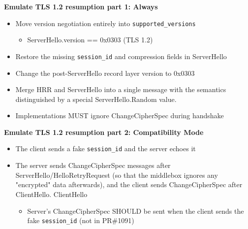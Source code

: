 \documentclass[helvetica]{seminar}
\newcommand{\heading}[1]{%
  \begin{center} 
    \large\bf 
    #1 
  \end{center} 
  \vspace{.4 in}}
\begin{document}
\begin{slide}
  \heading{Emulate TLS 1.2 resumption part 1: Always}

  \begin{itemize}
  \item Move version negotiation entirely into \verb^supported_versions^
    \begin{itemize}
    \item ServerHello.version == 0x0303 (TLS 1.2)
    \end{itemize}
  \item Restore the missing \verb^session_id^ and compression fields in ServerHello
  \item Change the post-ServerHello record layer version to 0x0303
  \item Merge HRR and ServerHello into a single message with the semantics
    distinguished by a special ServerHello.Random value.
    \item Implementations MUST ignore ChangeCipherSpec during handshake
  \end{itemize}
\end{slide}

\begin{slide}
  \heading{Emulate TLS 1.2 resumption part 2: Compatibility Mode}

  \begin{itemize}
  \item The client sends a fake \verb^session_id^ and the server echoes it
  \item The server sends ChangeCipherSpec messages after
    ServerHello/HelloRetryRequest (so that the middlebox ignores any
    "encrypted" data afterwards), and the client sends ChangeCipherSpec
    after ClientHello.
    ClientHello
    \begin{itemize}
    \item Server's ChangeCipherSpec SHOULD be sent when the client sends
      the fake \verb^session_id^ (not in PR\#1091)
    \end{itemize}
  \end{itemize}
\end{slide}
\end{document}
